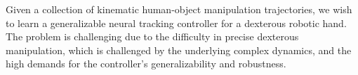 Given a collection of kinematic human-object manipulation trajectories, we wish to learn a generalizable neural tracking controller for a dexterous robotic hand. 
\textcolor{myblue}{
The problem is challenging due to the difficulty in precise dexterous manipulation, which is challenged by the underlying complex dynamics, and the high demands for the controller's generalizability and robustness.
}









